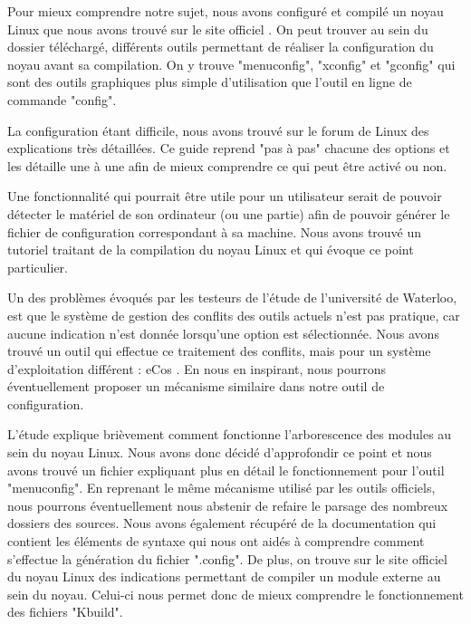 \documentclass[16pts]{report}
\begin{document}
Pour mieux comprendre notre sujet, nous avons configuré et compilé un noyau
Linux que nous avons trouvé sur le site officiel \cite{Kernel}. On peut trouver
au sein du dossier téléchargé, différents outils permettant de réaliser la
configuration du noyau avant sa compilation. On y trouve "menuconfig",
"xconfig" et "gconfig" qui sont des outils graphiques plus simple d'utilisation
que l'outil en ligne de commande "config".

La configuration étant difficile, nous avons trouvé sur le forum de Linux
\cite{Existant:Kernel:ForumTutoConfig} des explications très détaillées. Ce
guide reprend "pas à pas" chacune des options et les détaille une à une afin
de mieux comprendre ce qui peut être activé ou non.

Une fonctionnalité qui pourrait être utile pour un utilisateur serait de
pouvoir détecter le matériel de son ordinateur (ou une partie) afin de pouvoir
générer le fichier de configuration correspondant à sa machine. Nous avons
trouvé un tutoriel \cite{Existant:Kernel:outils} traitant de la compilation du
noyau Linux et qui évoque ce point particulier.

Un des problèmes évoqués par les testeurs de l'étude \cite{Waterloo:Etude} de
l'université de Waterloo, est que le système de gestion des conflits des outils
actuels n'est pas pratique, car aucune indication n'est donnée lorsqu'une
option est sélectionnée. Nous avons trouvé un outil qui effectue ce traitement
des conflits, mais pour un système d'exploitation différent : eCos
\cite{Existant:EcosConfig}. En nous en inspirant, nous pourrons éventuellement
proposer un mécanisme similaire dans notre outil de configuration.


L'étude \cite{Waterloo:Etude} explique brièvement comment fonctionne
l'arborescence des modules au sein du noyau Linux. Nous avons donc décidé
d'approfondir ce point et nous avons trouvé un fichier
\cite{Existant:Kconfig:frontends} expliquant plus en détail le fonctionnement
pour l'outil "menuconfig". En reprenant le même mécanisme utilisé par les
outils officiels, nous pourrons éventuellement nous abstenir de refaire le
parsage des nombreux dossiers des sources. Nous avons également récupéré de la
documentation \cite{Existant:Kconfig:vueDensemble}
\cite{Existant:Kconfig:langage} qui contient les éléments de syntaxe qui nous
ont aidés à comprendre comment s'effectue la génération du fichier ".config".
De plus, on trouve sur le site officiel du noyau Linux des indications
\cite{Existant:Kconfig:modules} permettant de compiler un module externe au
sein du noyau. Celui-ci nous permet donc de mieux comprendre le fonctionnement
des fichiers "Kbuild".
\end{document}
